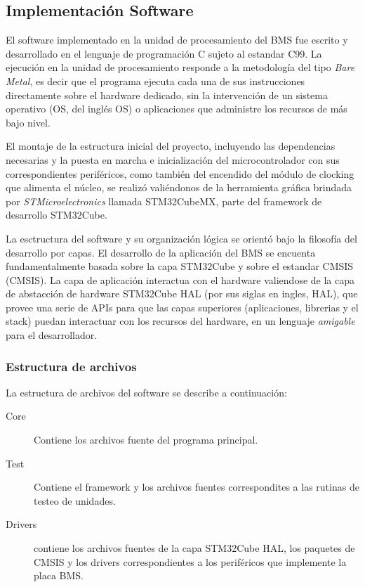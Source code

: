 \documentclass[10pt, a4paper]{article}
\begin{document}
\newpage


\subsection{Implementación Software}\label{software_implementation}

El software implementado en la unidad de procesamiento del \acrshort{BMS} fue
escrito y desarrollado en el lenguaje de programación C sujeto al estandar C99.
La ejecución en la unidad de procesamiento responde a la metodología del tipo
\emph{Bare Metal}, es decir que el programa ejecuta cada una de sus
instrucciones directamente sobre el hardware dedicado, sin la intervención de
un sistema operativo (\acrshort{OS}, del ingl\'es \acrlong{OS}) o aplicaciones 
que administre los recursos de más bajo nivel.

El montaje de la estructura inicial del proyecto, incluyendo las dependencias
necesarias y la puesta en marcha e inicialización del microcontrolador con sus
correspondientes periféricos, como también del encendido del módulo de clocking
que alimenta el núcleo, se realizó vali\'endonos de la herramienta gráfica
brindada por \emph{STMicroelectronics} llamada STM32CubeMX, parte del framework
de desarrollo STM32Cube. 

La esctructura del software y su organización lógica se orientó bajo la
filosofía del desarrollo por capas. El desarrollo de la aplicación del
\acrshort{BMS} se encuenta fundamentalmente basada sobre la capa STM32Cube  
y sobre el estandar \acrshort{CMSIS} (\acrlong{CMSIS}).
La capa de aplicación interactua con el hardware valiendose de la capa de
abstacción de hardware STM32Cube \acrshort{HAL} (por sus siglas en ingles,
\acrfull{HAL}), que provee una serie de \acrshort{API}s para que las capas 
superiores (aplicaciones, librerias y el stack) puedan interactuar con los 
recursos del hardware, en un lenguaje \emph{amigable} para el desarrollador.

\subsubsection{Estructura de archivos}

La estructura de archivos del software se describe a continuación:

\begin{description}
    \item [Core] Contiene los archivos fuente del programa principal.
    \item [Test] Contiene el framework y los archivos fuentes correspondites a
        las rutinas de testeo de unidades.
    \item[Drivers] contiene los archivos fuentes de la capa STM32Cube HAL, los
        paquetes de \acrshort{CMSIS} y los drivers correspondientes a los periféricos que
        implemente la placa \acrshort{BMS}.
\end{description}
\end{document}
